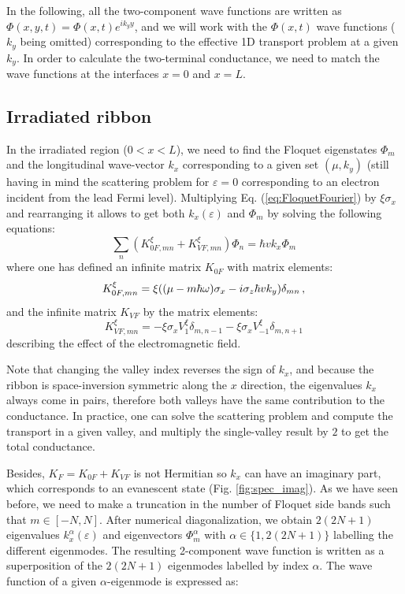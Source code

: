 \documentclass[aps,prb,showpacs,superscriptaddress,twocolumn,10pt,floatfix]{revtex4-1}
\newcommand{\ep}{\varepsilon}
\begin{document}
In the following, all the two-component wave functions are written as $\Phi(x,y,t)=\Phi(x,t) e^{i k_y y}$, and we will work with the $\Phi(x,t)$ wave functions ($k_y$ being omitted) corresponding to the effective 1D transport problem at a given $k_y$. In order to calculate the two-terminal conductance, we need to match the wave functions at the interfaces $x=0$ and $x=L$. 

\subsection{Irradiated ribbon}
\label{sec:irrad}


In the irradiated region ($0<x<L$), we need to find the Floquet eigenstates $\Phi_m$ and the longitudinal wave-vector $k_x$ corresponding to a given set $(\mu,k_y)$ (still having in mind the scattering problem for $\ep=0$ corresponding to an electron incident from the lead Fermi level). Multiplying Eq. (\ref{eq:FloquetFourier}) by $\xi\sigma_x$ and rearranging it allows to get both $k_x(\ep)$ and  $\Phi_m$ by solving the following equations:
\begin{equation}
\sum_n (K_{0F,mn}^\xi+K_{VF,mn}^\xi) \Phi_n =\hbar v k_x \Phi_m \,
\end{equation}
where one has defined an infinite matrix $K_{0F}$ with matrix elements:
\begin{equation}
K_{0F,mn}^\xi=\xi((\mu - m \hbar\omega  )\sigma_x  - i  \sigma_z\hbar v k_y) \delta_{mn}  \, ,\\
\end{equation}
and the infinite matrix $K_{VF}$ by the matrix elements:
\begin{equation}
K_{VF,mn}^\xi=-\xi\sigma_x V_{1}^\xi \delta_{m,n-1} -\xi\sigma_x V_{-1}^\xi \delta_{m,n+1} \,
\end{equation}
describing the effect of the electromagnetic field. 

Note that changing the valley index reverses the sign of $k_x$, and because the ribbon is space-inversion symmetric along the $x$ direction, the eigenvalues $k_x$ always come in pairs, therefore both valleys have the same contribution to the conductance. In practice, one can solve the scattering problem and compute the transport in a given valley, and multiply the single-valley result by $2$ to get the total conductance.

Besides, $K_F=K_{0F}+K_{VF}$ is not Hermitian so $k_x$ can have an imaginary part, which corresponds to an evanescent state (Fig. \ref{fig:spec_imag}). As we have seen before, we need to make a truncation in the number of Floquet side bands such that $m\in[-N,N]$.  After numerical diagonalization, we obtain $2(2N+1)$ eigenvalues $k_x^{\alpha}(\ep)$ and eigenvectors $\Phi^{\alpha}_m$ with $\alpha\in\{1,2(2N+1)\}$ labelling the different eigenmodes. The resulting 2-component wave function is written as a superposition of the $2(2N+1)$ eigenmodes labelled by index $\alpha$. The wave function of a given $\alpha$-eigenmode is expressed as: 
\end{document}
